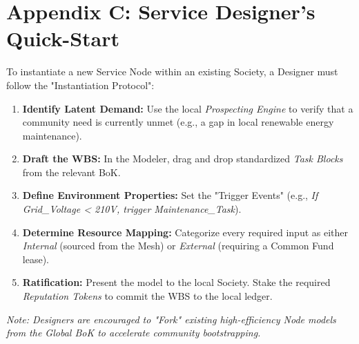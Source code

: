 \section*{Appendix C: Service Designer’s Quick-Start}

To instantiate a new Service Node within an existing Society, a Designer must follow the "Instantiation Protocol":

\begin{enumerate}
    \item \textbf{Identify Latent Demand:} Use the local \textit{Prospecting Engine} to verify that a community need is currently unmet (e.g., a gap in local renewable energy maintenance).
    \item \textbf{Draft the WBS:} In the Modeler, drag and drop standardized \textit{Task Blocks} from the relevant BoK. 
    \item \textbf{Define Environment Properties:} Set the "Trigger Events" (e.g., \textit{If Grid\_Voltage < 210V, trigger Maintenance\_Task}).
    \item \textbf{Determine Resource Mapping:} Categorize every required input as either \textit{Internal} (sourced from the Mesh) or \textit{External} (requiring a Common Fund lease).
    \item \textbf{Ratification:} Present the model to the local Society. Stake the required \textit{Reputation Tokens} to commit the WBS to the local ledger.
\end{enumerate}



\noindent \textit{Note: Designers are encouraged to "Fork" existing high-efficiency Node models from the Global BoK to accelerate community bootstrapping.}
